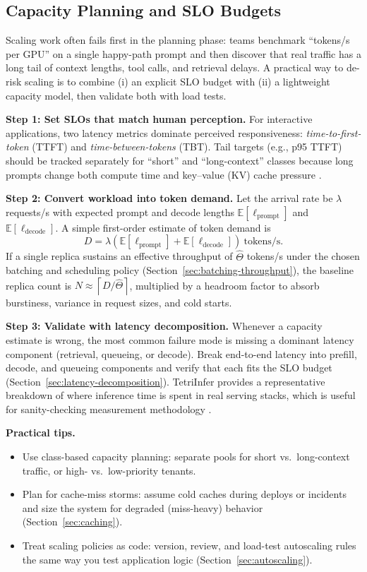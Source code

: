 \subsection{Capacity Planning and SLO Budgets}
\label{sec:scaling-capacity-planning}
Scaling work often fails first in the planning phase: teams benchmark ``tokens/s per GPU'' on a single happy-path prompt and then discover that real traffic has a long tail of context lengths, tool calls, and retrieval delays. A practical way to de-risk scaling is to combine (i) an explicit SLO budget with (ii) a lightweight capacity model, then validate both with load tests.

\medskip
\noindent\textbf{Step 1: Set SLOs that match human perception.}
For interactive applications, two latency metrics dominate perceived responsiveness: \emph{time-to-first-token} (TTFT) and \emph{time-between-tokens} (TBT). Tail targets (e.g., p95 TTFT) should be tracked separately for ``short'' and ``long-context'' classes because long prompts change both compute time and key--value (KV) cache pressure \cite{vaswani2017_attention,vllm_pagedattention}.

\medskip
\noindent\textbf{Step 2: Convert workload into token demand.}
Let the arrival rate be $\lambda$ requests/s with expected prompt and decode lengths $\mathbb{E}[\ell_{\text{prompt}}]$ and $\mathbb{E}[\ell_{\text{decode}}]$. A simple first-order estimate of token demand is
\[
D = \lambda \left(\mathbb{E}[\ell_{\text{prompt}}] + \mathbb{E}[\ell_{\text{decode}}]\right)\ \text{tokens/s}.
\]
If a single replica sustains an effective throughput of $\hat{\Theta}$ tokens/s under the chosen batching and scheduling policy (Section~\ref{sec:batching-throughput}), the baseline replica count is $N \approx \left\lceil D/\hat{\Theta} \right\rceil$, multiplied by a headroom factor to absorb burstiness, variance in request sizes, and cold starts.

\medskip
\noindent\textbf{Step 3: Validate with latency decomposition.}
Whenever a capacity estimate is wrong, the most common failure mode is missing a dominant latency component (retrieval, queueing, or decode). Break end-to-end latency into prefill, decode, and queueing components and verify that each fits the SLO budget (Section~\ref{sec:latency-decomposition}). TetriInfer provides a representative breakdown of where inference time is spent in real serving stacks, which is useful for sanity-checking measurement methodology \cite{tetriinfer2023}.

\medskip
\noindent\textbf{Practical tips.}
\begin{itemize}[leftmargin=1.2em]
  \item Use class-based capacity planning: separate pools for short vs.\ long-context traffic, or high- vs.\ low-priority tenants.
  \item Plan for cache-miss storms: assume cold caches during deploys or incidents and size the system for degraded (miss-heavy) behavior (Section~\ref{sec:caching}).
  \item Treat scaling policies as code: version, review, and load-test autoscaling rules the same way you test application logic (Section~\ref{sec:autoscaling}).
\end{itemize}

